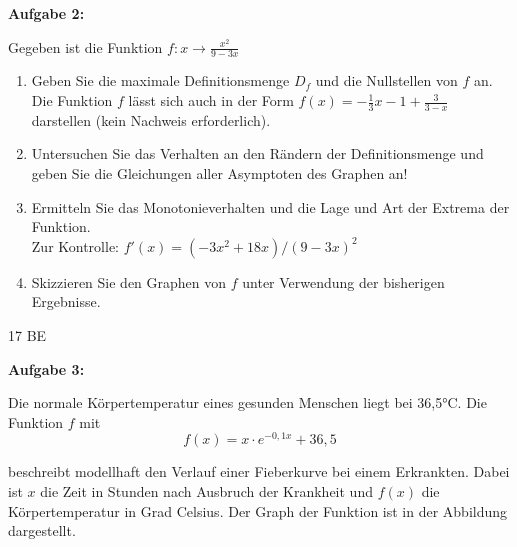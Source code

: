 \documentclass[a4paper,12pt]{article}
\newcommand{\Aufgabe}[1]{
  {
  \vspace*{0.5cm}
  \textsf{\textbf{Aufgabe #1}}
  \vspace*{0.2cm}
  
  }
}
\begin{document}
\Aufgabe{2:} 
Gegeben ist die Funktion $f: x \rightarrow \frac{x^2}{9-3x}$
\begin{enumerate}[label={\alph*)}]
  \item Geben Sie die maximale Definitionsmenge $D_f$ und die Nullstellen von $f$ an.\\
Die Funktion $f$ lässt sich auch in der Form
    $f(x) = - \frac{1}{3}x - 1 + \frac{3}{3-x}$ 
darstellen (kein Nachweis erforderlich).


\item Untersuchen Sie das Verhalten an den Rändern der Definitionsmenge und geben Sie die Gleichungen aller Asymptoten des Graphen an!
\item Ermitteln Sie das Monotonieverhalten und die Lage und Art der Extrema der Funktion.\\
 \lbrack Zur Kontrolle: $f'(x) = (-3x^2+18x) / (9-3x)^2$\rbrack

\item Skizzieren Sie den Graphen von $f$ unter Verwendung der bisherigen Ergebnisse.

\end{enumerate}
\begin{flushright}17 BE \end{flushright}

  \newpage
\Aufgabe{3:}

Die normale Körpertemperatur eines gesunden Menschen liegt bei 36,5°C. Die Funktion $f$ mit
\[ f(x)=x\cdot{e} ^ {-0,1x} +36,5 \]

beschreibt modellhaft den Verlauf einer Fieberkurve bei einem Erkrankten. Dabei ist $x$ die Zeit in Stunden nach Ausbruch der Krankheit und $f(x)$ die Körpertemperatur in Grad Celsius. Der Graph der Funktion ist in der Abbildung dargestellt.
\end{document}
